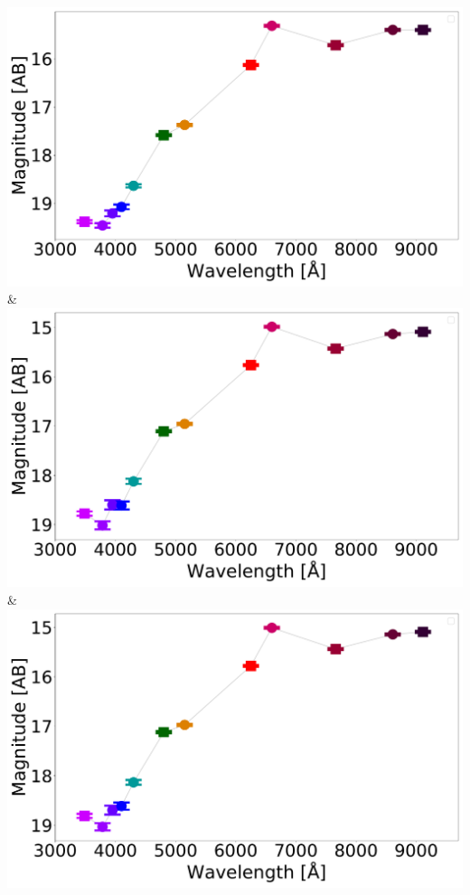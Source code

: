 \includegraphics[width=0.3\linewidth, clip]{photopectrum_splus_MC0133-025038_pne-smc-splus-match-2007_aper.pdf} & \includegraphics[width=0.3\linewidth, clip]{photopectrum_splus_MC0133-025038_pne-smc-splus-match-2007_auto.pdf} & \includegraphics[width=0.3\linewidth, clip]{photopectrum_splus_MC0133-025038_pne-smc-splus-match-2007_petro.pdf} \\
